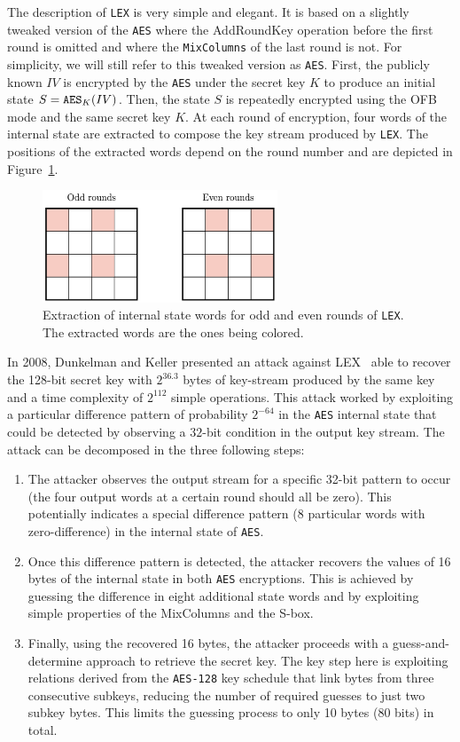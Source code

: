 The description of {\tt LEX} is very simple and elegant. It is based on a slightly tweaked version of the {\tt AES} where the {\sf AddRoundKey} operation before the first round is omitted and where the {\tt MixColumns} of the last round is not. For simplicity, we will still refer to this tweaked version as {\tt AES}. First, the publicly known $IV$ is encrypted by the {\tt AES} under the secret key $K$ to produce an initial state  $S = {\tt AES}_K(IV)$. Then, the state $S$ is repeatedly encrypted using the OFB mode and the same secret key $K$. At each round of encryption, four words of the internal state are extracted to compose the key stream produced by {\tt LEX}. The positions of the extracted words depend on the round number and are depicted in Figure~\ref{fig:lex}.

\begin{figure}
  \centering
  \includegraphics[width=7cm]{figures/lex.png}
  \caption{Extraction of internal state words for odd and even rounds of {\tt LEX}\label{fig:lex}. The extracted words are the ones being colored.}
\end{figure}

In 2008, Dunkelman and Keller presented an attack against LEX~\cite{AC:DunKel08b} able to recover the 128-bit secret key with $2^{36.3}$ bytes of key-stream produced by the same key and a time complexity of $2^{112}$ simple operations. This attack worked by exploiting a particular difference pattern of probability $2^{-64}$ in the {\tt AES} internal state that could be detected by observing a $32$-bit condition in the output key stream.  The attack can be decomposed  in the three following steps:
\begin{enumerate}
\item  The attacker observes the output stream for a specific 32-bit pattern to occur (the four output words at a certain round should all be zero). This potentially indicates a special difference pattern (8 particular words with zero-difference) in the internal state of {\tt AES}. 
\item Once this difference pattern is detected, the attacker recovers the values of 16 bytes of the internal state in both {\tt AES} encryptions. This is achieved by guessing the difference in eight additional state words and by exploiting simple properties of the  {\sf MixColumns} and the  S-box. 
\item Finally, using the recovered 16 bytes, the attacker proceeds with a guess-and-determine approach to retrieve the secret key. The key step here is exploiting relations derived from the {\tt AES-128} key schedule that link bytes from three consecutive subkeys, reducing the number of required guesses to just two subkey bytes. This limits the guessing process to only 10 bytes (80 bits) in total.
\end{enumerate}

